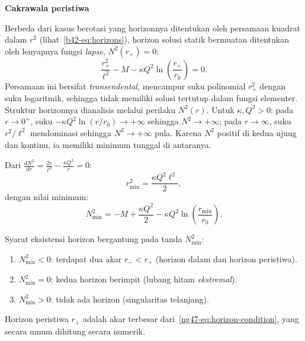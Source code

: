\vspace{0.5em}
\noindent \textbf{Cakrawala peristiwa}

Berbeda dari kasus berotasi yang horizonnya ditentukan oleh persamaan kuadrat dalam $r^2$ (lihat~\eqref{b42-eq:horizons}), horizon solusi statik bermuatan ditentukan oleh lenyapnya fungsi \emph{lapse}, $N^2(r_+) = 0$:
\begin{equation}\label{ng47-eq:horizon-condition}
    \frac{r_+^2}{\ell^2} - M - \kappa Q^2\ln\!\left(\frac{r_+}{r_0}\right) = 0.
\end{equation}
Persamaan ini bersifat \emph{transendental}, mencampur suku polinomial $r_+^2$ dengan suku logaritmik, sehingga tidak memiliki solusi tertutup dalam fungsi elementer. Struktur horizonnya dianalisis melalui perilaku $N^2(r)$. Untuk $\kappa, Q^2 > 0$: pada $r \to 0^+$, suku $-\kappa Q^2\ln(r/r_0) \to +\infty$ sehingga $N^2 \to +\infty$; pada $r \to \infty$, suku $r^2/\ell^2$ mendominasi sehingga $N^2 \to +\infty$ pula. Karena $N^2$ positif di kedua ujung dan kontinu, ia memiliki minimum tunggal di antaranya.

Dari $\frac{dN^2}{dr} = \frac{2r}{\ell^2} - \frac{\kappa Q^2}{r} = 0$:
\begin{equation}\label{ng47-eq:rmin}
    r_{\min}^2 = \frac{\kappa Q^2\ell^2}{2},
\end{equation}
dengan nilai minimum:
\begin{equation}\label{ng47-eq:N2min}
    N^2_{\min} = -M + \frac{\kappa Q^2}{2} - \kappa Q^2\ln\!\left(\frac{r_{\min}}{r_0}\right).
\end{equation}

Syarat eksistensi horizon bergantung pada tanda $N^2_{\min}$:
\begin{enumerate}[label=\roman*.]
    \item $N^2_{\min} < 0$: terdapat dua akar $r_- < r_+$ (horizon dalam dan horizon peristiwa).
    \item $N^2_{\min} = 0$: kedua horizon berimpit (lubang hitam \emph{ekstremal}).
    \item $N^2_{\min} > 0$: tidak ada horizon (singularitas telanjang).
\end{enumerate}
Horizon peristiwa $r_+$ adalah akar terbesar dari~\eqref{ng47-eq:horizon-condition}, yang secara umum dihitung secara numerik.